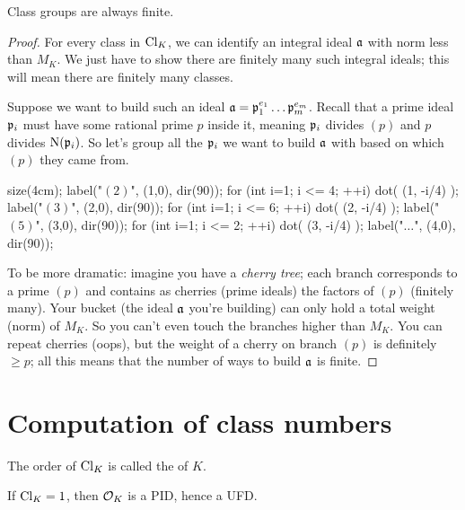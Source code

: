\begin{corollary}
	Class groups are always finite.
\end{corollary}
\begin{proof}
	For every class in $\mathrm{Cl}_K$,
	we can identify an integral ideal $\mathfrak a$ with norm less than $M_K$.
	We just have to show there are finitely many such integral ideals;
	this will mean there are finitely many classes.

	Suppose we want to build such an ideal $\mathfrak a = \mathfrak p_1^{e_1} \dots \mathfrak p_m^{e_m}$.
	Recall that a prime ideal $\mathfrak p_i$ must have some rational prime $p$ inside it,
	meaning $\mathfrak p_i$ divides $(p)$ and $p$ divides $\operatorname{N}(\mathfrak p_i)$.
	So let's group all the $\mathfrak p_i$ we want to build $\mathfrak a$ with based on which $(p)$ they came from.
	\begin{center}
		\begin{asy}
			size(4cm);
			label("$(2)$", (1,0), dir(90));
			for (int i=1; i <= 4; ++i) dot( (1, -i/4) );
			label("$(3)$", (2,0), dir(90));
			for (int i=1; i <= 6; ++i) dot( (2, -i/4) );
			label("$(5)$", (3,0), dir(90));
			for (int i=1; i <= 2; ++i) dot( (3, -i/4) );
			label("$\dots$", (4,0), dir(90));
		\end{asy}
	\end{center}
	To be more dramatic: imagine you have a \emph{cherry tree};
	each branch corresponds to a prime $(p)$
	and contains as cherries (prime ideals) the factors of $(p)$ (finitely many).
	Your bucket (the ideal $\mathfrak a$ you're building) can only hold a total weight
	(norm) of $M_K$.  So you can't even touch the branches higher than $M_K$.
	You can repeat cherries (oops),
	but the weight of a cherry on branch $(p)$ is definitely $\ge p$;
	all this means that the number of ways to build $\mathfrak a$ is finite.
\end{proof}

\section{Computation of class numbers}
\begin{definition}
The order of $\mathrm{Cl}_K$ is called the  of $K$.
\end{definition}
\begin{remark}
	If $\mathrm{Cl}_K = 1$, then $\mathcal O_K$ is a PID, hence a UFD.
\end{remark}

